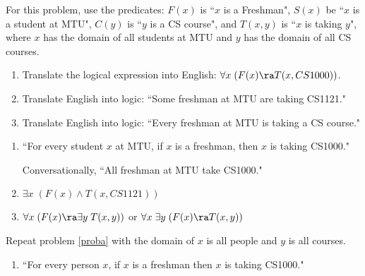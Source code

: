 \begin{questions}
\label{proba} For this problem, use the predicates: $F(x)$ is ``$x$ is a Freshman", $S(x)$ be ``$x$ is a student at MTU", $C(y)$ is ``$y$ is a CS course", and $T(x,y)$ is ``$x$ is taking $y$", where $x$ has the domain of all students at MTU and $y$ has the domain of all CS courses.
\begin{enumerate}[label=(\alph*),itemsep=0pt,parsep=0pt,
	topsep=0pt,partopsep=0pt]
    \item Translate the logical expression into English: $\forall x\; (F(x) \ra T(x,CS1000))$.
    \item Translate English into logic: ``Some freshman at MTU are taking CS1121."
    \item Translate English into logic: ``Every freshman at MTU is taking a CS course."
\end{enumerate}
    \ifprintanswers
        \vspace{-12pt}
    \fi
\begin{solution}
    \begin{enumerate}[label=(\alph*),itemsep=0pt,parsep=0pt,
    	topsep=0pt,partopsep=0pt]
        \item ``For every student $x$ at MTU, if $x$ is a freshman, then $x$ is taking CS1000."

            Conversationally, ``All freshman at MTU take CS1000."
        \item $\exists x\; (F(x) \wedge T(x,CS 1121))$
        \item $\forall x\; (F(x) \ra \exists y\; T(x,y))$ or $\forall x\; \exists y\; (F(x) \ra T(x,y))$
    \end{enumerate}
\end{solution}


 Repeat problem \ref{proba} with the domain of $x$ is all people and $y$ is all courses.
    \ifprintanswers
        \vspace{-12pt}
    \fi
\begin{solution}
    \begin{enumerate}[label=(\alph*),itemsep=0pt,parsep=0pt,
    	topsep=0pt,partopsep=0pt]
        \item  ``For every person $x$, if $x$ is a freshman then $x$ is taking CS1000."


\end{enumerate}
\end{solution}
\end{questions}
